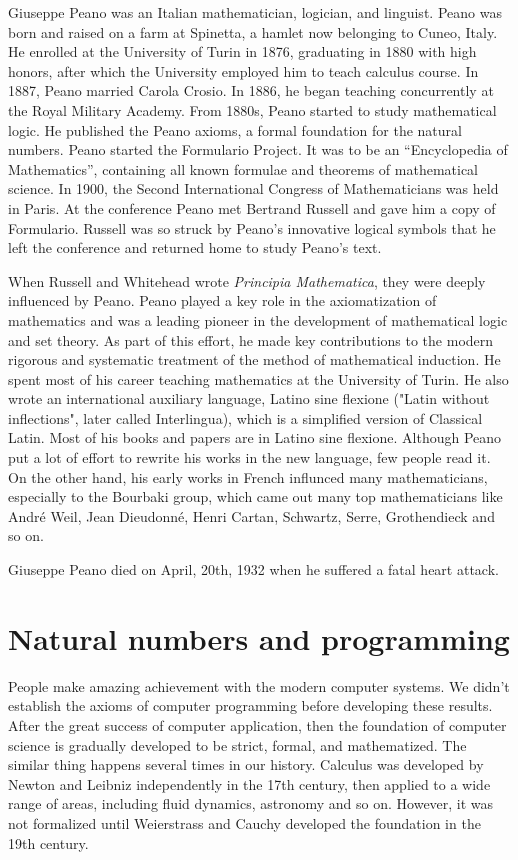 \documentclass[UTF8]{article}
\begin{document}
Giuseppe Peano was an Italian mathematician, logician, and linguist. Peano was born and raised on a farm at Spinetta, a hamlet now belonging to Cuneo, Italy. He enrolled at the University of Turin in 1876, graduating in 1880 with high honors, after which the University employed him to teach calculus course. In 1887, Peano married Carola Crosio. In 1886, he began teaching concurrently at the Royal Military Academy. From 1880s, Peano started to study mathematical logic. He published the Peano axioms, a formal foundation for the natural numbers. Peano started the Formulario Project. It was to be an ``Encyclopedia of Mathematics'', containing all known formulae and theorems of mathematical science. In 1900, the Second International Congress of Mathematicians was held in Paris. At the conference Peano met Bertrand Russell and gave him a copy of Formulario. Russell was so struck by Peano's innovative logical symbols that he left the conference and returned home to study Peano's text\cite{M-Kline-2007}.

When Russell and Whitehead wrote {\em Principia Mathematica}, they were deeply influenced by Peano. Peano played a key role in the axiomatization of mathematics and was a leading pioneer in the development of mathematical logic and set theory. As part of this effort, he made key contributions to the modern rigorous and systematic treatment of the method of mathematical induction. He spent most of his career teaching mathematics at the University of Turin. He also wrote an international auxiliary language, Latino sine flexione ("Latin without inflections", later called Interlingua), which is a simplified version of Classical Latin. Most of his books and papers are in Latino sine flexione. Although Peano put a lot of effort to rewrite his works in the new language, few people read it. On the other hand, his early works in French influnced many mathematicians, especially to the Bourbaki group, which came out many top mathematicians like André Weil, Jean Dieudonné, Henri Cartan, Schwartz, Serre, Grothendieck and so on.

Giuseppe Peano died on April, 20th, 1932 when he suffered a fatal heart attack.

\section{Natural numbers and programming}

People make amazing achievement with the modern computer systems. We didn't establish the axioms of computer programming before developing these results. After the great success of computer application, then the foundation of computer science is gradually developed to be strict, formal, and mathematized. The similar thing happens several times in our history. Calculus was developed by Newton and Leibniz independently in the 17th century, then applied to a wide range of areas, including fluid dynamics, astronomy and so on. However, it was not formalized until Weierstrass and Cauchy developed the foundation in the 19th century\cite{M-Kline-2007}.
\end{document}
